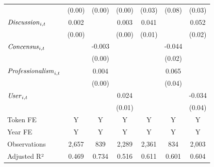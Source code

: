 {\begin{tabular}{l*{6}{c}}
                    &      (0.00)         &      (0.00)         &      (0.00)         &      (0.03)         &      (0.08)         &      (0.03)         \\
${\it Discussion}_{i,t}$&       0.002         &                     &       0.003         &       0.041\sym{***}&                     &       0.052\sym{***}\\
                    &      (0.00)         &                     &      (0.00)         &      (0.01)         &                     &      (0.02)         \\
${\it Concensus}_{i,t}$&                     &      -0.003\sym{**} &                     &                     &      -0.044\sym{*}  &                     \\
                    &                     &      (0.00)         &                     &                     &      (0.02)         &                     \\
${\it Professionalism}_{i,t}$&                     &       0.004         &                     &                     &       0.065         &                     \\
                    &                     &      (0.00)         &                     &                     &      (0.04)         &                     \\
${\it User}_{i,t}$  &                     &                     &       0.024\sym{***}&                     &                     &      -0.034         \\
                    &                     &                     &      (0.01)         &                     &                     &      (0.04)         \\
\midrule
Token FE            &           Y         &           Y         &           Y         &           Y         &           Y         &           Y         \\
Year FE             &           Y         &           Y         &           Y         &           Y         &           Y         &           Y         \\
Observations        &       2,657         &         839         &       2,289         &       2,361         &         834         &       2,003         \\
Adjusted R²         &       0.469         &       0.734         &       0.516         &       0.611         &       0.601         &       0.604         \\
\bottomrule
\end{tabular}
}

